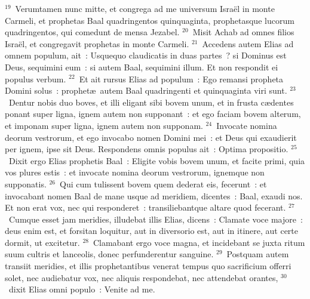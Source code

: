 ${}^{19}$~Verumtamen nunc mitte, et congrega ad me universum Isra\"el in monte Carmeli, et prophetas Baal quadringentos quinquaginta, prophetasque lucorum quadringentos, qui comedunt de mensa Jezabel.
${}^{20}$~Misit Achab ad omnes filios Isra\"el, et congregavit prophetas in monte Carmeli.
${}^{21}$~Accedens autem Elias ad omnem populum, ait~: Usquequo claudicatis in duas partes~? si Dominus est Deus, sequimini eum~: si autem Baal, sequimini illum. Et non respondit ei populus verbum.
${}^{22}$~Et ait rursus Elias ad populum~: Ego remansi propheta Domini solus~: prophet\ae\ autem Baal quadringenti et quinquaginta viri sunt.
${}^{23}$~Dentur nobis duo boves, et illi eligant sibi bovem unum, et in frusta c\ae dentes ponant super ligna, ignem autem non supponant~: et ego faciam bovem alterum, et imponam super ligna, ignem autem non supponam.
${}^{24}$~Invocate nomina deorum vestrorum, et ego invocabo nomen Domini mei~: et Deus qui exaudierit per ignem, ipse sit Deus. Respondens omnis populus ait~: Optima propositio.
${}^{25}$~Dixit ergo Elias prophetis Baal~: Eligite vobis bovem unum, et facite primi, quia vos plures estis~: et invocate nomina deorum vestrorum, ignemque non supponatis.
${}^{26}$~Qui cum tulissent bovem quem dederat eis, fecerunt~: et invocabant nomen Baal de mane usque ad meridiem, dicentes~: Baal, exaudi nos. Et non erat vox, nec qui responderet~: transiliebantque altare quod fecerant.
${}^{27}$~Cumque esset jam meridies, illudebat illis Elias, dicens~: Clamate voce majore~: deus enim est, et forsitan loquitur, aut in diversorio est, aut in itinere, aut certe dormit, ut excitetur.
${}^{28}$~Clamabant ergo voce magna, et incidebant se juxta ritum suum cultris et lanceolis, donec perfunderentur sanguine.
${}^{29}$~Postquam autem transiit meridies, et illis prophetantibus venerat tempus quo sacrificium offerri solet, nec audiebatur vox, nec aliquis respondebat, nec attendebat orantes,
${}^{30}$~dixit Elias omni populo~: Venite ad me.

